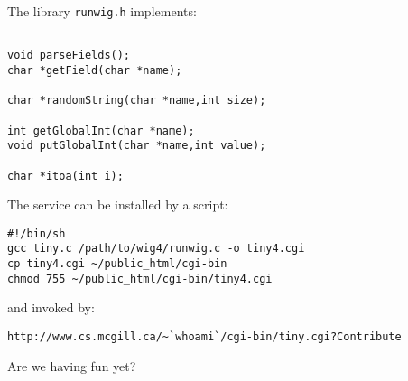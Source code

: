 \begin{slide*}
The library {\tt runwig.h} implements:

\begin{scriptsize}
\begin{verbatim}

void parseFields();
char *getField(char *name);

char *randomString(char *name,int size);

int getGlobalInt(char *name);
void putGlobalInt(char *name,int value);

char *itoa(int i);
\end{verbatim}
\end{scriptsize}
\vfil
\end{slide*}
 
\begin{slide*}
The service can be installed by a script:

\begin{scriptsize}
\begin{verbatim}
#!/bin/sh
gcc tiny.c /path/to/wig4/runwig.c -o tiny4.cgi
cp tiny4.cgi ~/public_html/cgi-bin
chmod 755 ~/public_html/cgi-bin/tiny4.cgi
\end{verbatim}
\end{scriptsize}

and invoked by:

\begin{scriptsize}
\begin{verbatim}
http://www.cs.mcgill.ca/~`whoami`/cgi-bin/tiny.cgi?Contribute
\end{verbatim}
\end{scriptsize}

\vspace{0.5in}
Are we having fun yet?
\vfil
\end{slide*}
 

